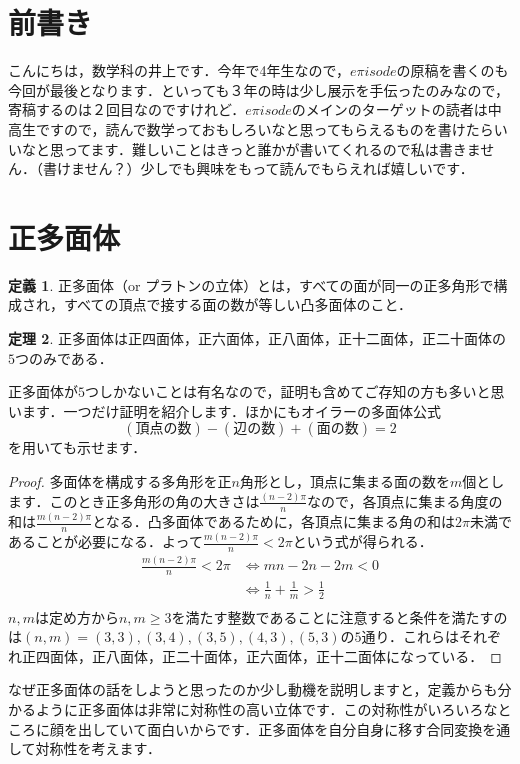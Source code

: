\documentclass[/main]{subfiles} %
\theoremstyle{definition} %
\newtheorem{idefi}{定義}[section]
\newtheorem{ithm}[idefi]{定理}
\begin{document}
\section{前書き}
こんにちは，数学科の井上です．今年で4年生なので，$e\pi isode$の原稿を書くのも今回が最後となります．といっても３年の時は少し展示を手伝ったのみなので，寄稿するのは２回目なのですけれど．$e\pi isode$のメインのターゲットの読者は中高生ですので，読んで数学っておもしろいなと思ってもらえるものを書けたらいいなと思ってます．難しいことはきっと誰かが書いてくれるので私は書きません．（書けません？）少しでも興味をもって読んでもらえれば嬉しいです．%

\section{正多面体}
\begin{idefi}
  正多面体（or プラトンの立体）とは，すべての面が同一の正多角形で構成され，すべての頂点で接する面の数が等しい凸多面体のこと．
\end{idefi}
\begin{ithm}
  正多面体は正四面体，正六面体，正八面体，正十二面体，正二十面体の$5$つのみである．
\end{ithm}
正多面体が$5$つしかないことは有名なので，証明も含めてご存知の方も多いと思います．一つだけ証明を紹介します．ほかにもオイラーの多面体公式
\[(頂点の数)-(\text{辺の数})+(\text{面の数})=2\] %
を用いても示せます．
\begin{proof}
  多面体を構成する多角形を正$n$角形とし，頂点に集まる面の数を$m$個とします．このとき正多角形の角の大きさは$\frac{(n-2)\pi}{n}$なので，各頂点に集まる角度の和は$\frac{m(n-2)\pi}{n}$となる．凸多面体であるために，各頂点に集まる角の和は$2\pi$未満であることが必要になる．よって$\frac{m(n-2)\pi}{n}<2\pi$という式が得られる．
    \begin{align*}
      \frac{m(n-2)\pi}{n}<2\pi & \Longleftrightarrow mn-2n-2m<0 \\
                               & \Longleftrightarrow  \frac{1}{n}+\frac{1}{m}>\frac{1}{2}\\
    \end{align*}
  $n,m$は定め方から$n,m\geq3$を満たす整数であることに注意すると条件を満たすのは$(n,m)=(3,3),(3,4),(3,5),(4,3),(5,3)$の$5$通り．これらはそれぞれ正四面体，正八面体，正二十面体，正六面体，正十二面体になっている．
\end{proof}
なぜ正多面体の話をしようと思ったのか少し動機を説明しますと，定義からも分かるように正多面体は非常に対称性の高い立体です．この対称性がいろいろなところに顔を出していて面白いからです．正多面体を自分自身に移す合同変換を通して対称性を考えます．
\end{document}
